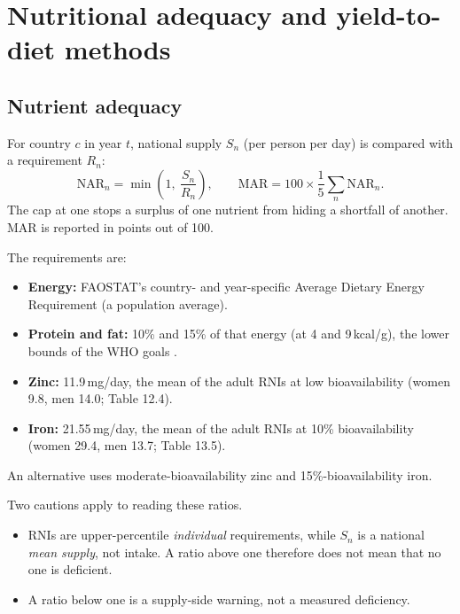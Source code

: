 \section{Nutritional adequacy and yield-to-diet methods}\label{sec:nutmethod}

\subsection{Nutrient adequacy}\label{sec:adequacy}
For country $c$ in year $t$, national supply $S_n$ (per person per day) is compared with a requirement $R_n$:
\begin{equation}\label{eq:nar}
\text{NAR}_n = \min\!\left(1,\ \frac{S_n}{R_n}\right),\qquad \text{MAR} = 100\times\frac15\sum_n \text{NAR}_n .
\end{equation}
The cap at one stops a surplus of one nutrient from hiding a shortfall of another. MAR is reported in points out
of 100.

The requirements are:
\begin{itemize}
\item \textbf{Energy:} FAOSTAT's country- and year-specific Average Dietary Energy Requirement (a population
average).
\item \textbf{Protein and fat:} 10\% and 15\% of that energy (at 4 and 9\,kcal/g), the lower bounds of the WHO
goals \citep{who2003}.
\item \textbf{Zinc:} 11.9\,mg/day, the mean of the adult RNIs at low bioavailability (women 9.8, men 14.0;
\citealp{whofao2004} Table 12.4).
\item \textbf{Iron:} 21.55\,mg/day, the mean of the adult RNIs at 10\% bioavailability (women 29.4, men 13.7;
Table 13.5).
\end{itemize}
An alternative uses moderate-bioavailability zinc and 15\%-bioavailability iron.

Two cautions apply to reading these ratios.
\begin{itemize}
\item RNIs are upper-percentile \emph{individual} requirements, while $S_n$ is a national \emph{mean supply},
not intake. A ratio above one therefore does not mean that no one is deficient.
\item A ratio below one is a supply-side warning, not a measured deficiency.
\end{itemize}

